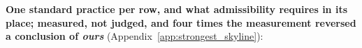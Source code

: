 \noindent\textbf{One standard practice per row, and what admissibility requires in its place; measured, not judged, and four times the measurement reversed a conclusion of \emph{ours}} (Appendix~\ref{app:strongest_skyline}):

